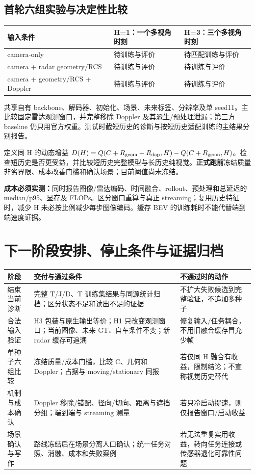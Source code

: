 \documentclass[UTF8,a4paper,11pt,fontset=none]{ctexart}
\newcommand{\pending}[1]{\textcolor{pendingred}{#1}}
\begin{document}
\subsection{首轮六组实验与决定性比较}
\begin{center}\small
\begin{tabularx}{\linewidth}{lYY}
\toprule
输入条件 & H=1：一个多视角时刻 & H=3：三个多视角时刻\\
\midrule
camera-only & \pending{待训练与评价} & \pending{待匹配训练与评价}\\
camera + radar geometry/RCS & \pending{待训练与评价} & \pending{待训练与评价}\\
camera + geometry/RCS + Doppler & \pending{待训练与评价} & \pending{待训练与评价}\\
\bottomrule
\end{tabularx}\end{center}
共享自有 backbone、解码器、初始化、场景、未来标签、分辨率及单 seed11。主比较固定雷达观测窗口，并完整移除 Doppler 及其派生/预处理泄漏；第三方 baseline 仍只用官方权重。测试时截短历史的诊断与按短历史适配训练的主结果分别报告。

定义同 H 的动态增益 $D(H)=Q(C+R_{\rm geom}+R_{\rm dop},H)-Q(C+R_{\rm geom},H)$。检查短历史是否更受益，并比较短历史完整模型与长历史纯视觉。\textbf{正式跑前}冻结质量非劣界限、成本改善门槛和确认场景；目前阈值尚未冻结。

\textbf{成本必须实测：}同时报告图像/雷达编码、时间融合、rollout、预处理和总延迟的 median/p95、显存及 FLOPs。区分窗口重算与真正 streaming；复用历史特征时，减少 H 未必按比例减少每步图像编码。缓存 BEV 的训练耗时不能代替端到端速度证据。

\clearpage
\section{下一阶段安排、停止条件与证据归档}
\begin{center}\small
\begin{tabularx}{\linewidth}{p{22mm}YY}
\toprule
阶段 & 交付与通过条件 & 不通过时的动作\\
\midrule
结束当前诊断 & 完整 T/J/D、T 训练集结果与同源统计归档；区分状态不足和读出不足的证据 & 不扩大失败候选到完整验证，不追加多种子\\
合法输入验证 & H3 包装与原生输出等价；H1 只改变观测窗口；当前图像、未来 GT、自车条件不变；新 radar 缓存可追溯 & 修复输入/任务耦合，不用旧融合缓存冒充少帧\\
单种子六组比较 & 冻结质量/成本门槛，比较 C、几何和 Doppler；占据与 moving/stationary 同报 & 若仅同 H 融合有收益，限制结论；不宣称视觉历史替代\\
机制与成本确认 & Doppler 移除/错配、径向/切向、距离与遮挡分组；端到端与 streaming 测量 & 若只冷启动提速，则仅报告窗口/启动收益\\
场景确认与写作 & 路线冻结后在场景分离人口确认；统一任务对照、消融、成本和失败案例 & 若无法重复实用收益，转向任务连接或传感器退化可靠性问题\\
\bottomrule
\end{tabularx}\end{center}
\end{document}
